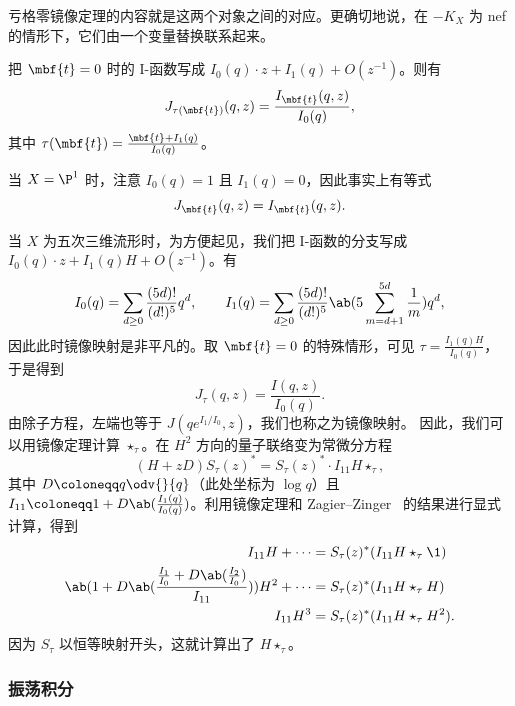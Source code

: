 亏格零镜像定理的内容就是这两个对象之间的对应。更确切地说，在 \(-K_X\) 为 nef 的情形下，它们由一个变量替换联系起来。

\begin{thm}
    把 \(\mbf{t} = 0\) 时的 I-函数写成 \(I_0(q) \cdot z + I_1(q) + O(z^{-1})\)。则有
    \[
        J_{\tau(\mbf{t})}(q,z) = \frac{I_{\mbf{t}}(q,z)}{I_0(q)},
    \]
    其中 \(\tau(\mbf{t}) = \frac{\mbf{t} + I_1(q)}{I_0(q)}\)。
\end{thm}

\begin{exm}
    当 \(X = \P^1\) 时，注意 \(I_0(q) = 1\) 且 \(I_1(q) = 0\)，因此事实上有等式
    \[ J_{\mbf{t}}(q,z) = I_{\mbf{t}}(q,z). \]
\end{exm}

\begin{exm}
    当 \(X\) 为五次三维流形时，为方便起见，我们把 I-函数的分支写成 \(I_0(q) \cdot z + I_1(q)H + O(z^{-1})\)。有
    \[ I_0(q) = \sum_{d \geq 0} \frac{(5d)!}{(d!)^5} q^d, \qquad I_1(q) = \sum_{d \geq 0} \frac{(5d)!}{(d!)^5} \ab(5\sum_{m=d+1}^{5d} \frac{1}{m}) q^d, \]
    因此此时镜像映射是非平凡的。取 \(\mbf{t} = 0\) 的特殊情形，可见 \(\tau = \frac{I_1(q)H}{I_0(q)}\)，于是得到
    \[ J_{\tau}(q,z) = \frac{I(q,z)}{I_0(q)}. \]
    由除子方程，左端也等于 \(J(qe^{I_1/I_0}, z)\)，我们也称之为镜像映射。
    因此，我们可以用镜像定理计算 $\star_{\tau}$。在 \(H^2\) 方向的量子联络变为常微分方程
    \[ (H+zD) S_{\tau}(z)^* = S_{\tau}(z)^* \cdot I_{11} H \star_{\tau}, \]
    其中 $D \coloneqq q \odv{}{q}$（此处坐标为 $\log q$）且 $I_{11} \coloneqq 1 + D \ab(\frac{I_1(q)}{I_0(q)})$。利用镜像定理和 Zagier--Zinger~\cite{ZagierZinger2008} 的结果进行显式计算，得到
    \begin{align*}
        I_{11} H + \cdots &= S_{\tau}(z)^* (I_{11} H \star_{\tau} \1) \\
        \ab( 1 + D\ab(\frac{\frac{I_1}{I_0} + D \ab(\frac{I_2}{I_0})}{I_{11}}) ) H^2 + \cdots &= S_{\tau}(z)^* (I_{11} H \star_{\tau} H) \\
        I_{11} H^3 &= S_{\tau}(z)^* (I_{11}H \star_{\tau} H^2).
    \end{align*}
    因为 $S_{\tau}$ 以恒等映射开头，这就计算出了 $H \star_{\tau}$。
\end{exm}

\subsubsection{振荡积分}%
\label{ssub:Oscillating integrals}

